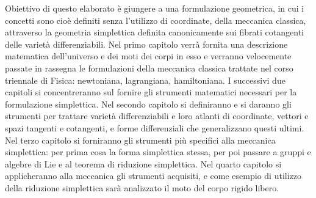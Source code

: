 Obiettivo di questo elaborato è giungere a una formulazione geometrica, in cui i concetti sono cioè definiti senza l'utilizzo di coordinate, della meccanica classica, attraverso la geometria simplettica definita canonicamente sui fibrati cotangenti delle varietà differenziabili. Nel primo capitolo verrà fornita una descrizione matematica dell'universo e dei moti dei corpi in esso e verranno velocemente passate in rassegna le formulazioni della meccanica classica trattate nel corso triennale di Fisica: newtoniana, lagrangiana, hamiltoniana. I successivi due capitoli si concentreranno sul fornire gli strumenti matematici necessari per la formulazione simplettica. Nel secondo capitolo si definiranno e si daranno gli strumenti per trattare varietà differenziabili e loro atlanti di coordinate, vettori e spazi tangenti e cotangenti, e forme differenziali che generalizzano questi ultimi. Nel terzo capitolo si forniranno gli strumenti più specifici alla meccanica simplettica: per prima cosa la forma simplettica stessa, per poi passare a gruppi e algebre di Lie e al teorema di riduzione simplettica. Nel quarto capitolo si applicheranno alla meccanica gli strumenti acquisiti, e come esempio di utilizzo della riduzione simplettica sarà analizzato il moto del corpo rigido libero.